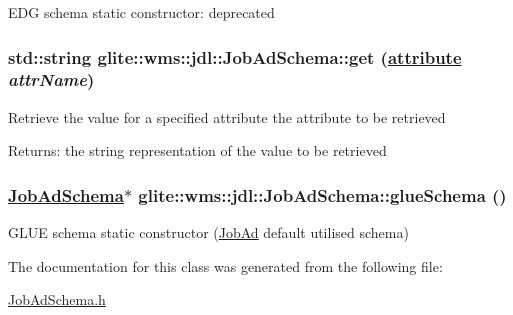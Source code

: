 EDG schema static constructor: deprecated \hypertarget{classglite_1_1wms_1_1jdl_1_1JobAdSchema_a1}{
\subsubsection[get]{\setlength{\rightskip}{0pt plus 5cm}std::string glite::wms::jdl::Job\-Ad\-Schema::get (\hyperlink{classglite_1_1wms_1_1jdl_1_1JobAdSchema_w6}{attribute} {\em attr\-Name})}}
\label{classglite_1_1wms_1_1jdl_1_1JobAdSchema_a1}


Retrieve the value for a specified attribute  the attribute to be retrieved \begin{Desc}
\item[Returns:]the string representation of the value to be retrieved \end{Desc}
\hypertarget{classglite_1_1wms_1_1jdl_1_1JobAdSchema_e0}{
\subsubsection[glueSchema]{\setlength{\rightskip}{0pt plus 5cm}\hyperlink{classglite_1_1wms_1_1jdl_1_1JobAdSchema}{Job\-Ad\-Schema}$\ast$ glite::wms::jdl::Job\-Ad\-Schema::glue\-Schema ()}}
\label{classglite_1_1wms_1_1jdl_1_1JobAdSchema_e0}


GLUE schema static constructor (\hyperlink{classglite_1_1wms_1_1jdl_1_1JobAd}{Job\-Ad} default utilised schema) 

The documentation for this class was generated from the following file:\begin{CompactItemize}
\item 
\hyperlink{JobAdSchema_8h}{Job\-Ad\-Schema.h}\end{CompactItemize}
